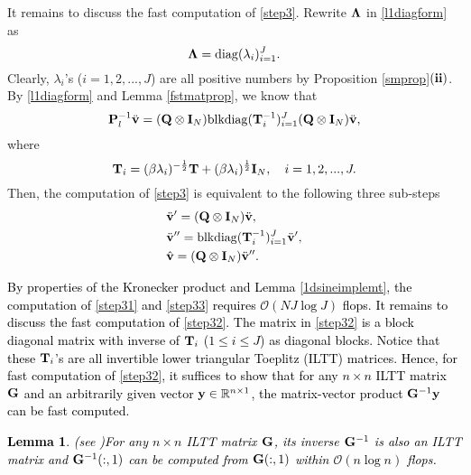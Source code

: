\documentclass[11pt]{article}%
\numberwithin{equation}{section}
\newtheorem{lemma}[theorem]{Lemma}
\newcommand{\diag}{\mathrm{diag}}
\newcommand{\blockdiag}{\mathrm{blkdiag}}
\begin{document}
It remains to discuss the fast computation of \eqref{step3}. Rewrite ${\bf \Lambda}$ in \eqref{l1diagform} as
\begin{equation*}
{\bf \Lambda}=\diag(\lambda_i)_{i=1}^{J}.
\end{equation*}
Clearly, $\lambda_i$'s ($i=1,2,...,J$) are all positive numbers by Proposition \ref{smprop}${\bf (ii)}$. By \eqref{l1diagform} and Lemma \ref{fstmatprop}, we know that
\begin{equation}\label{step3decomp}
{\bf P}_l^{-1}\ddot{\bf v}=({\bf Q}\otimes{\bf I}_N)\textcolor{black}{\blockdiag}({\bf T}_i^{-1})_{i=1}^{ J }({\bf Q}\otimes{\bf I}_N)\ddot{\bf v},
\end{equation}
where
\begin{equation*}
{\bf T}_i=(\beta{\lambda}_i)^{-\frac{1}{2}}{\bf T}+(\beta{\lambda}_i)^{\frac{1}{2}}{\bf I}_N,\quad i= 1,2,...,J.
\end{equation*}
Then, the computation of \eqref{step3} is equivalent to the following three sub-steps
\begin{align}
&\ddot{\bf v}^{\prime}=({\bf Q}\otimes{\bf I}_N)\ddot{\bf v},\label{step31}\\
&\ddot{\bf v}^{\prime\prime}=\textcolor{black}{\blockdiag}({\bf T}_i^{-1})_{i=1}^{ J }\ddot{\bf v}^{\prime},\label{step32}\\
&\hat{\bf v}=({\bf Q}\otimes{\bf I}_N)\ddot{\bf v}^{\prime\prime}.\label{step33}
\end{align}
\textcolor{black}{By properties of the Kronecker product and Lemma \ref{1dsineimplemt}, the computation of \eqref{step31} and \eqref{step33} requires $\mathcal{O}(NJ\log J)$ flops. It remains to discuss the fast computation of \eqref{step32}. The matrix in \eqref{step32} is a block diagonal matrix with inverse of ${\bf T}_i$ ($1\leq i\leq J$) as diagonal blocks. Notice that these ${\bf T}_i$'s are all invertible lower triangular Toeplitz (ILTT) matrices. Hence, for fast computation of \eqref{step32}, it suffices to show that for any $n\times n$ ILTT matrix ${\bf G}$ and an arbitrarily given vector ${\bf y}\in\mathbb{R}^{n\times 1}$, the matrix-vector product ${\bf G}^{-1}{\bf y}$ can be fast computed.
\begin{lemma}\textnormal{(see \cite{commenges1984fast})}\label{invlttlm}
	For any $n\times n $ ILTT matrix ${\bf G}$, its inverse ${\bf G}^{-1}$ is also an ILTT matrix and ${\bf G}^{-1}(:,1)$ can be computed from ${\bf G}(:,1)$ within $\mathcal{O}(n\log n)$ flops.
\end{lemma}} 
\end{document}

